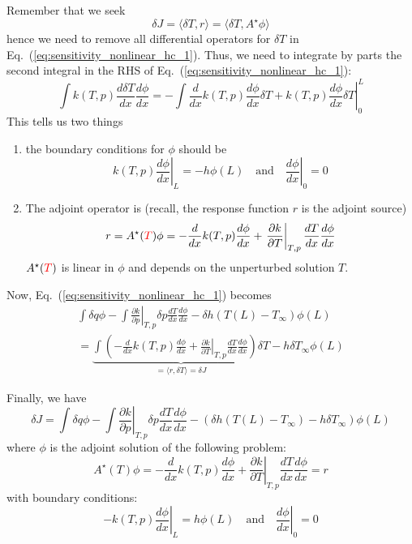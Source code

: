 \documentclass[11pt]{article}
\newcommand{\eqt}[1]{Eq.~(\ref{#1})}                     %
\newcommand{\be}{\begin{equation}}
\newcommand{\ee}{\end{equation}}
\newcommand{\tcr}[1]{\textcolor{red}{#1}}
\begin{document}
Remember that we seek 
\[
\delta J = \langle \delta T, r \rangle = \langle \delta T, A^\star \phi \rangle 
\]
hence we need to remove all differential operators for $\delta T$ in \eqt{eq:sensitivity_nonlinear_hc_1}. Thus, we need to integrate by parts the second integral in the RHS of \eqt{eq:sensitivity_nonlinear_hc_1}:
\[
\int k(T,p)\frac{d\delta T}{dx}\frac{d\phi}{dx} 
=
-\int \frac{d}{dx}k(T,p)\frac{d\phi}{dx} \delta T + \left.k(T,p)\frac{d\phi}{dx}\delta T\right|_0^L
\]
This tells us two things
\begin{enumerate}
\item the boundary conditions for $\phi$ should be
\[
\left.k(T,p)\frac{d\phi}{dx}\right|_L = -h\phi(L) \quad \text{and} \quad \left.\frac{d\phi}{dx}\right|_0 = 0
\]
\item The adjoint operator is (recall, the response function $r$ is the adjoint source)
\[
r=A^\star(\tcr{T}) \phi  = -\frac{d}{dx}k(T,p)\frac{d\phi}{dx} + \left.\frac{\partial k}{\partial T}\right|_{T,p} \frac{dT}{dx}\frac{d\phi}{dx} 
\]
$A^\star(\tcr{T})$ is linear in $\phi$ and depends on the unperturbed solution $T$.
\end{enumerate}

Now, \eqt{eq:sensitivity_nonlinear_hc_1} becomes
\begin{multline}
\int \delta q\phi 
-\int \left.\frac{\partial k}{\partial p}\right|_{T,p}\delta p \frac{dT}{dx}\frac{d\phi}{dx} 
-\delta h(T(L)-T_\infty)  \phi(L)
\\=
\underbrace{
\int \left(
- \frac{d}{dx}k(T,p)\frac{d\phi}{dx} 
+ \left.\frac{\partial k}{\partial T}\right|_{T,p} \frac{dT}{dx}\frac{d\phi}{dx} 
\right) 
\delta T 
}
_{=\langle r,\delta T \rangle = \delta J}
-h\delta T_\infty \phi(L)
\end{multline}

Finally, we have
\be
\boxed{
\delta J = 
\int \delta q\phi 
-\int \left.\frac{\partial k}{\partial p}\right|_{T,p}\delta p \frac{dT}{dx}\frac{d\phi}{dx} 
-\left(\delta h(T(L)-T_\infty)  - h\delta T_\infty \right)\phi(L)
}
\ee
where $\phi$ is the adjoint solution of the following problem:
\[
A^\star(T) \phi  = -\frac{d}{dx}k(T,p)\frac{d\phi}{dx} + \left.\frac{\partial k}{\partial T}\right|_{T,p} \frac{dT}{dx}\frac{d\phi}{dx} = r
\]
with boundary conditions:
\[
-\left.k(T,p)\frac{d\phi}{dx}\right|_L = h\phi(L) \quad \text{and} \quad \left.\frac{d\phi}{dx}\right|_0 = 0
\]

\end{document}
